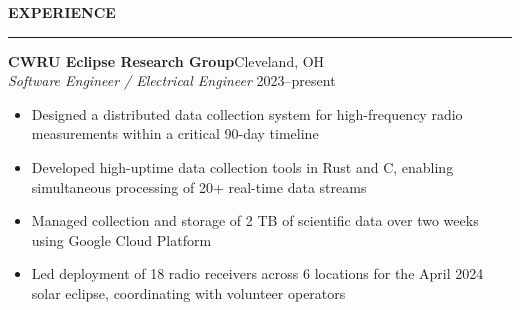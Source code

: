 \documentclass[notitlepage,10pt,a4paper]{article}
\newenvironment{resumesection}[1]{
    \header{#1}
}{}
\newcommand{\header}[1]{
    \vspace{2pt}
    \textcolor{accent1}{\Large \textbf{#1}}
    \vspace{6pt}\hrule\vspace{4pt}
}
\newcommand{\TECH}{
    \textcolor{accent3}{\small\textbf{SKILLS}}\small\,
}
\newcommand{\thingsep}{
    \vspace{4pt}
}
\begin{document}
\begin{resumesection}{EXPERIENCE}

    \textcolor{accent2}{\textbf{\large{CWRU Eclipse Research Group}}}\hfill\normalsize Cleveland, OH\\
    \textit{Software Engineer / Electrical Engineer} \hfill {\small 2023--present}
    {\small\begin{itemize}[noitemsep, font=\small, label={-}, leftmargin=*, topsep=0pt, partopsep=0pt]
        \item Designed a distributed data collection system for high-frequency radio measurements within a critical 90-day timeline
        \item Developed high-uptime data collection tools in Rust and C, enabling simultaneous processing of 20+ real-time data streams
        \item Managed collection and storage of 2 TB of scientific data over two weeks using Google Cloud Platform
        \item Led deployment of 18 radio receivers across 6 locations for the April 2024 solar eclipse, coordinating with volunteer operators
    \end{itemize}}
    \thingsep





\end{resumesection}
\end{document}
